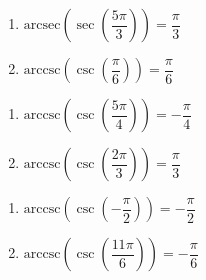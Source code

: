 \begin{multicols}{2}

\begin{enumerate}

\setcounter{enumi}{\value{HW}}

\item  $\text{arcsec}\left(\sec\left(\dfrac{5\pi}{3}\right) \right) = \dfrac{\pi}{3}$
\item  $\text{arccsc}\left(\csc\left(\dfrac{\pi}{6}\right) \right) = \dfrac{\pi}{6}$ 

\setcounter{HW}{\value{enumi}}

\end{enumerate}

\end{multicols}

\begin{multicols}{2}

\begin{enumerate}

\setcounter{enumi}{\value{HW}}

\item  $\text{arccsc}\left(\csc\left(\dfrac{5\pi}{4}\right) \right) = -\dfrac{\pi}{4}$
\item  $\text{arccsc}\left(\csc\left( \dfrac{2\pi}{3} \right) \right) = \dfrac{\pi}{3}$

\setcounter{HW}{\value{enumi}}

\end{enumerate}

\end{multicols}

\begin{multicols}{2}

\begin{enumerate}

\setcounter{enumi}{\value{HW}}

\item  $\text{arccsc}\left(\csc\left(-\dfrac{\pi}{2} \right) \right) = -\dfrac{\pi}{2}$ 
\item  $\text{arccsc}\left(\csc\left(\dfrac{11\pi}{6}\right) \right) = -\dfrac{\pi}{6}$

\setcounter{HW}{\value{enumi}}

\end{enumerate}

\end{multicols}


